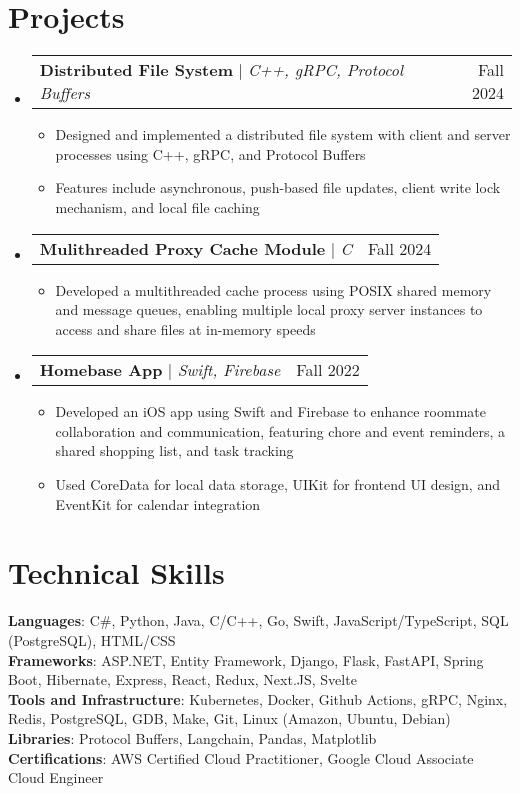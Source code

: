 \documentclass[letterpaper,11pt]{article}
\makeatletter
\newcommand{\resumeItem}[1]{
  \item\small{
    {#1 \vspace{-2pt}}
  }
}
\newcommand{\resumeProjectHeading}[2]{
    \item
    \begin{tabular*}{0.97\textwidth}{l@{\extracolsep{\fill}}r}
      \small#1 & #2 \\
    \end{tabular*}\vspace{-7pt}
}
\newcommand{\resumeSubHeadingListStart}{\begin{itemize}[leftmargin=0.15in, label={}]}
\newcommand{\resumeSubHeadingListEnd}{\end{itemize}}
\newcommand{\resumeItemListStart}{\begin{itemize}}
\newcommand{\resumeItemListEnd}{\end{itemize}\vspace{-5pt}}
\makeatother
\begin{document}
\section{Projects}
    \resumeSubHeadingListStart
      \resumeProjectHeading
          {\textbf{Distributed File System} $|$ \emph{C++, gRPC, Protocol Buffers}}{Fall 2024}
          \resumeItemListStart
            \resumeItem{Designed and implemented a distributed file system with client and server processes using C++, gRPC, and Protocol Buffers}
            \resumeItem{Features include asynchronous, push-based file updates, client write lock mechanism, and local file caching}
          \resumeItemListEnd
      \resumeProjectHeading
          {\textbf{Mulithreaded Proxy Cache Module} $|$ \emph{C}}{Fall 2024}
          \resumeItemListStart
            \resumeItem{Developed a multithreaded cache process using POSIX shared memory and message queues, enabling multiple local proxy server instances to access and share files at in-memory speeds}
          \resumeItemListEnd
      \resumeProjectHeading
          {\textbf{Homebase App} $|$ \emph{Swift, Firebase}}{Fall 2022}
          \resumeItemListStart
            \resumeItem{Developed an iOS app using Swift and Firebase to enhance roommate collaboration and communication, featuring chore and event reminders, a shared shopping list, and task tracking}
            \resumeItem{Used CoreData for local data storage, UIKit for frontend UI design, and EventKit for calendar integration}
          \resumeItemListEnd
    \resumeSubHeadingListEnd

%
\section{Technical Skills}
 \begin{itemize}[leftmargin=0.15in, label={}]
    \small{\item{
     \textbf{Languages}{: C\#, Python, Java, C/C++, Go, Swift, JavaScript/TypeScript, SQL (PostgreSQL), HTML/CSS} \\
     \textbf{Frameworks}{: ASP.NET, Entity Framework, Django, Flask, FastAPI, Spring Boot, Hibernate, Express, React, Redux, Next.JS, Svelte} \\
         \textbf{Tools and Infrastructure}{: Kubernetes, Docker, Github Actions, gRPC, Nginx, Redis, PostgreSQL, GDB, Make, Git, Linux (Amazon, Ubuntu, Debian) } \\
     \textbf{Libraries}{: Protocol Buffers, Langchain, Pandas, Matplotlib } \\
     \textbf{Certifications}{: AWS Certified Cloud Practitioner, Google Cloud Associate Cloud Engineer}
    }}
 \end{itemize}

\end{document}
